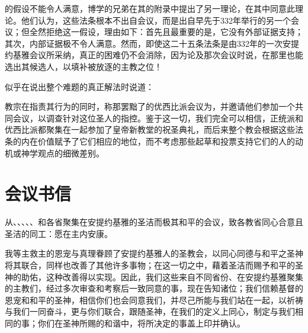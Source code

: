 的假设不能令人满意，博学的兄弟在其的附录中提出了另一理论，在其中同意此理论。他们认为，这些法条根本不出自会议，而是出自早先于332年举行的另一个会议；但全然拒绝这一假设，理由如下：首先且最重要的是，它没有外部证据支持；其次，内部证据极不令人满意。然而，即使这二十五条法条是由332年的一次安提约基雅会议所采纳，真正的困难仍不会消除，因为论及那次会议时说，在那里也能选出其候选人，以填补被放逐的主教之位！\par

似乎在说出整个难题的真正解法时说道：\par

教宗在指责其行为的同时，称那罢黜了的优西比派会议为，并邀请他们参加一个共同会议，以调查针对这位圣人的指控。鉴于这一切，我们完全可以相信，正统派和优西比派都聚集在一起参加了皇帝新教堂的祝圣典礼，而后来整个教会根据这些法条的内在价值赋予了它们相应的地位，而不考虑那些起草和投票支持它们的人的动机或神学观点的细微差别。\par


\section{会议书信}

从、、、、、和各省聚集在安提约基雅的圣洁而极其和平的会议，致各教省同心合意且圣洁的同工：愿在主内安康。\par

我等主救主的恩宠与真理眷顾了安提约基雅人的圣教会，以同心同德与和平之圣神将其联合，同样也改善了其他许多事物；在这一切之中，藉着圣洁而赐予和平的圣神的助佑，这种改善得以实现。因此，我们这些来自不同省份、在安提约基雅聚集的主教们，经过多次审查和考察后一致同意的事，现在告知诸位；我们信赖基督的恩宠和和平的圣神，相信你们也会同意我们，并尽己所能与我们站在一起，以祈祷与我们一同奋斗，更与你们联合，跟随圣神，在我们的定义上同心，制定与我们相同的事；你们在圣神所赐的和谐中，将所决定的事盖上印并确认。\par

